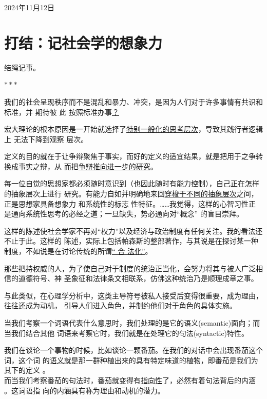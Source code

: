 \documentclass[a5paper, twoside]{article}
\newenvironment{smallmdframed}
  {\begin{mdframed}[linewidth=0.4pt]\small}
  {\end{mdframed}}
\begin{document}
\hfill 2024年11月12日

\newpage
\section{打结：记社会学的想象力}

结绳记事。

\begin{center}
	$***$
\end{center}

我们的社会呈现秩序而不是混乱和暴力、冲突，是因为人们对于许多事情有共识和标准，并
期待彼
此
按照标准办事\underline{？}

宏大理论的根本原因是一开始就选择了\underline{特别一般化的思考层次}，导致其践行者逻辑上
无法下降到观察
层次。

定义的目的就在于让争辩聚焦于事实，而好的定义的适宜结果，就是把用于之争转换成事实之辩，从
而把\underline{争辩推向进一步的研究}。

每一位自觉的思想家都必须随时意识到（也因此随时有能力控制），自己正在怎样的抽象层次上进行
研究。有能力自如并明确地来回\underline{穿梭于不同的抽象层次}之间，正是思想家具备想象力
和系统性的标志
性特征。……我觉得，这样的心智习性正是通向系统性思考的必经之道；一旦缺失，势必通向对“概念”
的盲目崇拜。

这样的陈述使社会学家不再对“权力”以及经济与政治制度有任何关注。我的看法还不止于此。这样的
陈述，实际上包括帕森斯的整部著作，与其说是在探讨某一种制度，不如说是在讨论传统的所谓\underline{“
合
法化”}。

那些把持权威的人，为了使自己对于制度的统治正当化，会努力将其与被人广泛相信的道德符号、神
圣象征和法律条文相联系，仿佛这种统治乃是顺理成章之事。

与此类似，在心理学分析中，这类主导符号被私人接受后变得很重要，成为理由，往往还成为动机，
引导人们进入角色，并制约他们对于角色的具体实施。

当我们考察一个词语代表什么意思时，我们处理的是它的语义(semantic)面向；而当我们结合其他
词语来考察它时，我们就是在处理它的句法(syntactic)特性。

\begin{smallmdframed}
	我们在谈论一个事物的时候，比如谈论一颗番茄。在我们的对话中会出现番茄这个词，这个词
	的\underline{语义}就是那一群种植出来的具有特定味道的植物，即番茄是我们为其下的定义
	。\\
	而当我们考察番茄的句法时，番茄就变得有\underline{指向性}了，必然有着句法背后的内涵
	。这词语指
	向的内涵具有称为理由和动机的潜力。
\end{smallmdframed}
\end{document}

